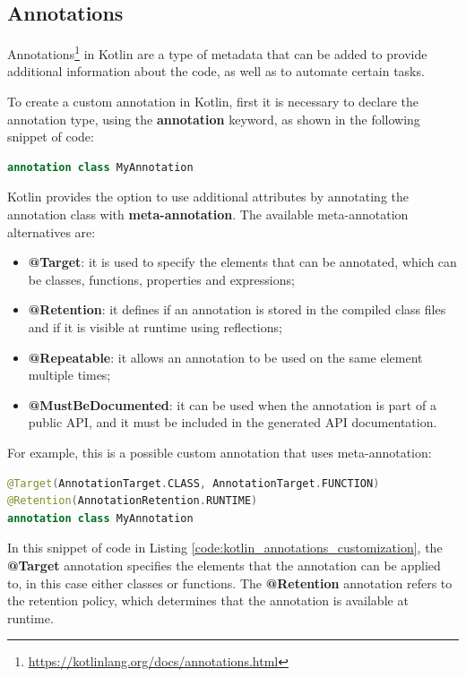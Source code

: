 \subsection{Annotations}\label{section:annotation}
Annotations\footnote{\url{https://kotlinlang.org/docs/annotations.html}} in Kotlin are a type of metadata that can be added to provide additional information about the code, as well as to automate certain tasks.

To create a custom annotation in Kotlin, first it is necessary to declare the annotation type, using the \textbf{annotation} keyword, as shown in the following snippet of code:
\begin{lstlisting}[caption={Example of creation of a custom annotation in Kotlin}, language=Kotlin, captionpos=b, label={code:kotlin_annotations_creation}]
annotation class MyAnnotation
\end{lstlisting}

Kotlin provides the option to use additional attributes by annotating the annotation class with \textbf{meta-annotation}. The available meta-annotation alternatives are:
\begin{itemize}
    \item \textbf{@Target}: it is used to specify the elements that can be annotated, which can be classes, functions, properties and expressions;
    \item \textbf{@Retention}: it defines if an annotation is stored in the compiled class files and if it is visible at runtime using reflections;
    \item \textbf{@Repeatable}: it allows an annotation to be used on the same element multiple times;
    \item \textbf{@MustBeDocumented}: it can be used when the annotation is part of a public API, and it must be included in the generated API documentation.
\end{itemize}

For example, this is a possible custom annotation that uses meta-annotation:
\begin{lstlisting}[caption={Example of custom annotation with meta-annotations in Kotlin}, language=Kotlin, captionpos=b, label={code:kotlin_annotations_customization}]
@Target(AnnotationTarget.CLASS, AnnotationTarget.FUNCTION)
@Retention(AnnotationRetention.RUNTIME)
annotation class MyAnnotation
\end{lstlisting}
In this snippet of code in Listing \ref{code:kotlin_annotations_customization}, the \textbf{@Target} annotation specifies the elements that the annotation can be applied to, in this case either classes or functions. The \textbf{@Retention} annotation refers to the retention policy, which determines that the annotation is available at runtime.

